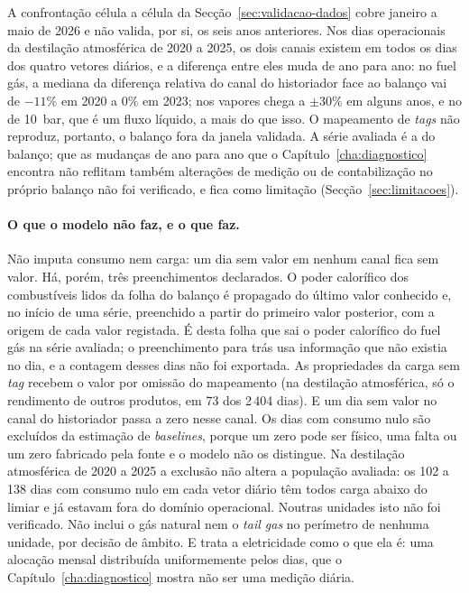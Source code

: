 A confrontação célula a célula da Secção~\ref{sec:validacao-dados} cobre
janeiro a maio de 2026 e não valida, por si, os seis anos anteriores. Nos
dias operacionais da destilação atmosférica de 2020 a 2025, os dois canais
existem em todos os dias dos quatro vetores diários, e a diferença entre
eles muda de ano para ano: no fuel gás, a mediana da diferença relativa do
canal do historiador face ao balanço vai de $-11\%$ em 2020 a $0\%$ em 2023;
nos vapores chega a $\pm30\%$ em alguns anos, e no de 10~bar, que é um fluxo
líquido, a mais do que isso. O mapeamento de \emph{tags} não reproduz, portanto,
o balanço fora da janela validada. A série avaliada é a do balanço; que as
mudanças de ano para ano que o Capítulo~\ref{cha:diagnostico} encontra não
reflitam também alterações de medição ou de contabilização no próprio
balanço não foi verificado, e fica como limitação
(Secção~\ref{sec:limitacoes}).

\paragraph{O que o modelo não faz, e o que faz.} Não imputa consumo nem
carga: um dia sem valor em nenhum canal fica sem valor. Há, porém, três
preenchimentos declarados. O poder calorífico dos combustíveis lidos da
folha do balanço é propagado do último valor conhecido e, no início de uma
série, preenchido a partir do primeiro valor posterior, com a origem de cada
valor registada. É desta folha que sai o poder calorífico do fuel gás na
série avaliada; o preenchimento para trás usa informação que não existia no
dia, e a contagem desses dias não foi exportada. As propriedades da carga
sem \emph{tag} recebem o valor por omissão do mapeamento (na destilação
atmosférica, só o rendimento de outros produtos, em 73 dos 2\,404 dias). E
um dia sem valor no canal do historiador passa a zero nesse canal. Os dias com
consumo nulo são excluídos da estimação de \emph{baselines}, porque um zero
pode ser físico, uma falta ou um zero fabricado pela fonte e o modelo não
os distingue. Na destilação atmosférica de 2020 a 2025 a exclusão não
altera a população avaliada: os 102 a 138 dias com consumo nulo em cada vetor
diário têm todos carga abaixo do limiar e já estavam fora do domínio
operacional. Noutras unidades isto não foi verificado. Não inclui o gás natural nem o
\emph{tail gas} no perímetro de nenhuma unidade, por decisão de âmbito.
E trata a eletricidade como o que ela é: uma alocação mensal distribuída
uniformemente pelos dias, que o Capítulo~\ref{cha:diagnostico} mostra não
ser uma medição diária.

